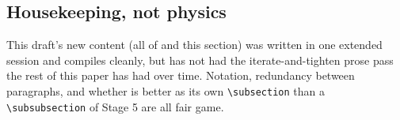 \documentclass{article}
\begin{document}
\subsection{Housekeeping, not physics}

This draft's new content (all of  and this section) was written in one
extended session and compiles cleanly, but has not had the iterate-and-tighten prose pass the
rest of this paper has had over time. Notation, redundancy between paragraphs, and whether
 is better as its own \texttt{\textbackslash subsection} than a
\texttt{\textbackslash subsubsection} of Stage 5 are all fair game.



\end{document}
